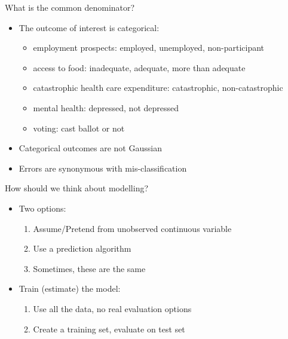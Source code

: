 \documentclass[
  ignorenonframetext,
]{beamer}
\providecommand{\tightlist}{%
  \setlength{\itemsep}{0pt}\setlength{\parskip}{0pt}}
\begin{document}
\begin{frame}{What is the common denominator?}
\protect{}\label{what-is-the-common-denominator}
\begin{itemize}
\item
  The outcome of interest is categorical:

  \begin{itemize}
  \tightlist
  \item
    employment prospects: employed, unemployed, non-participant
  \item
    access to food: inadequate, adequate, more than adequate
  \item
    catastrophic health care expenditure: catastrophic, non-catastrophic
  \item
    mental health: depressed, not depressed
  \item
    voting: cast ballot or not
  \end{itemize}
\item
  Categorical outcomes are not Gaussian
\item
  Errors are synonymous with mis-classification
\end{itemize}
\end{frame}

\begin{frame}{How should we think about modelling?}
\protect{}\label{how-should-we-think-about-modelling}
\begin{itemize}
\tightlist
\item
  Two options:

  \begin{enumerate}
  \tightlist
  \item
    Assume/Pretend from unobserved continuous variable
  \item
    Use a prediction algorithm
  \item
    Sometimes, these are the same
  \end{enumerate}
\item
  Train (estimate) the model:

  \begin{enumerate}
  \tightlist
  \item
    Use all the data, no real evaluation options
  \item
    Create a training set, evaluate on test set
  \end{enumerate}
\end{itemize}
\end{frame}
\end{document}
